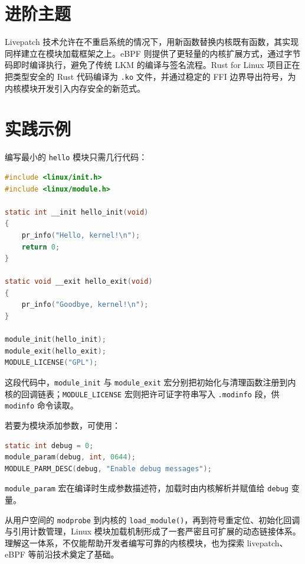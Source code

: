 \chapter{进阶主题}
Livepatch 技术允许在不重启系统的情况下，用新函数替换内核既有函数，其实现同样建立在模块加载框架之上。eBPF 则提供了更轻量的内核扩展方式，通过字节码即时编译执行，避免了传统 LKM 的编译与签名流程。Rust for Linux 项目正在把类型安全的 Rust 代码编译为 \texttt{.ko} 文件，并通过稳定的 FFI 边界导出符号，为内核模块开发引入内存安全的新范式。\par
\chapter{实践示例}
编写最小的 \texttt{hello} 模块只需几行代码：\par
\begin{lstlisting}[language=c]
#include <linux/init.h>
#include <linux/module.h>

static int __init hello_init(void)
{
    pr_info("Hello, kernel!\n");
    return 0;
}

static void __exit hello_exit(void)
{
    pr_info("Goodbye, kernel!\n");
}

module_init(hello_init);
module_exit(hello_exit);
MODULE_LICENSE("GPL");
\end{lstlisting}
这段代码中，\texttt{module\_{}init} 与 \texttt{module\_{}exit} 宏分别把初始化与清理函数注册到内核的回调链表；\texttt{MODULE\_{}LICENSE} 宏则把许可证字符串写入 \texttt{.modinfo} 段，供 \texttt{modinfo} 命令读取。\par
若要为模块添加参数，可使用：\par
\begin{lstlisting}[language=c]
static int debug = 0;
module_param(debug, int, 0644);
MODULE_PARM_DESC(debug, "Enable debug messages");
\end{lstlisting}
\texttt{module\_{}param} 宏在编译时生成参数描述符，加载时由内核解析并赋值给 \texttt{debug} 变量。\par
从用户空间的 \texttt{modprobe} 到内核的 \texttt{load\_{}module()}，再到符号重定位、初始化回调与引用计数管理，Linux 模块加载机制形成了一套严密且可扩展的动态链接体系。理解这一体系，不仅能帮助开发者编写可靠的内核模块，也为探索 livepatch、eBPF 等前沿技术奠定了基础。\par
